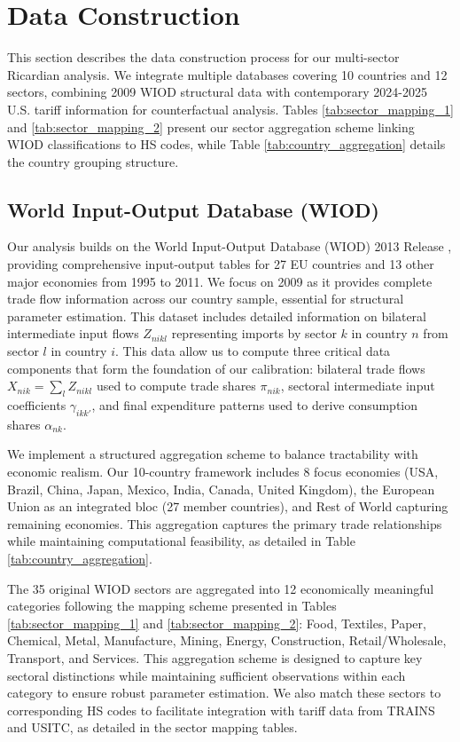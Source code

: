 \section{Data Construction}

This section describes the data construction process for our multi-sector Ricardian analysis. We integrate multiple databases covering 10 countries and 12 sectors, combining 2009 WIOD structural data with contemporary 2024-2025 U.S. tariff information for counterfactual analysis. Tables \ref{tab:sector_mapping_1} and \ref{tab:sector_mapping_2} present our sector aggregation scheme linking WIOD classifications to HS codes, while Table \ref{tab:country_aggregation} details the country grouping structure.

\subsection{World Input-Output Database (WIOD)}

Our analysis builds on the World Input-Output Database (WIOD) 2013 Release \citep{timmer2015illustrated}, providing comprehensive input-output tables for 27 EU countries and 13 other major economies from 1995 to 2011. We focus on 2009 as it provides complete trade flow information across our country sample, essential for structural parameter estimation. This dataset includes detailed information on bilateral intermediate input flows $Z_{nikl}$ representing imports by sector $k$ in country $n$ from sector $l$ in country $i$. This data allow us to compute three critical data components that form the foundation of our calibration: bilateral trade flows $X_{nik} = \sum_{l} Z_{nikl}$ used to compute trade shares $\pi_{nik}$, sectoral intermediate input coefficients $\gamma_{ikk'}$, and final expenditure patterns used to derive consumption shares $\alpha_{nk}$.

We implement a structured aggregation scheme to balance tractability with economic realism. Our 10-country framework includes 8 focus economies (USA, Brazil, China, Japan, Mexico, India, Canada, United Kingdom), the European Union as an integrated bloc (27 member countries), and Rest of World capturing remaining economies. This aggregation captures the primary trade relationships while maintaining computational feasibility, as detailed in Table \ref{tab:country_aggregation}. 

The 35 original WIOD sectors are aggregated into 12 economically meaningful categories following the mapping scheme presented in Tables \ref{tab:sector_mapping_1} and \ref{tab:sector_mapping_2}: Food, Textiles, Paper, Chemical, Metal, Manufacture, Mining, Energy, Construction, Retail/Wholesale, Transport, and Services. This aggregation scheme is designed to capture key sectoral distinctions while maintaining sufficient observations within each category to ensure robust parameter estimation. We also match these sectors to corresponding HS codes to facilitate integration with tariff data from TRAINS and USITC, as detailed in the sector mapping tables.

